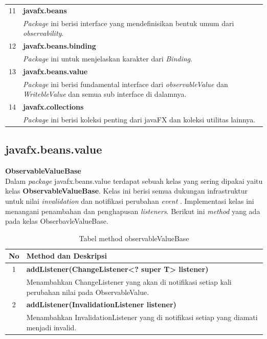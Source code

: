 \begin{table}[H]
\begin{tabular}{|c|p{12cm}|}
		11 & \textbf{javafx.beans}\\
			&	\textit{Package} ini berisi interface yang mendefinisikan bentuk umum dari \textit{observability}.\\ \hline
		12 & \textbf{javafx.beans.binding}\\
			&	\textit{Package} ini untuk menjelaskan karakter dari \textit{Binding}.\\ \hline	
		13 & \textbf{javafx.beans.value}\\
			&	\textit{Package} ini berisi fundamental interface dari \textit{observableValue} dan \textit{WritebleValue} dan semua sub interface di dalamnya.\\ \hline
		14 & \textbf{javafx.collections}\\
				&	\textit{Package} ini berisi koleksi penting dari javaFX dan koleksi utilitas lainnya.\\ \hline						
	\end{tabular}
\end{table}

\subsection{javafx.beans.value}
\textbf{ObservableValueBase}\\
Dalam \textit{package} javafx.beans.value terdapat sebuah kelas yang sering dipakai yaitu kelas \textbf{ObservableValueBase}. Kelas ini berisi semua dukungan infrastruktur untuk nilai \textit{invalidation} dan notifikasi perubahan \textit{event} . Implementasi kelas ini menangani penambahan dan penghapusan \textit{listeners}. Berikut ini \textit{method} yang ada pada kelas ObserbavleValueBase.
\begin{table}[H]
		\centering
		\caption{Tabel method observableValueBase}
		\label{tab:method_observableValueBase}
	\begin{tabular}{|c|p{12cm}|}
		\hline
		\textbf{No} & \textbf{Method dan Deskripsi} \\ \hline \hline
		1 & \textbf{addListener(ChangeListener<? super T> listener)}\\
			&	Menambahkan ChangeListener yang akan di notifikasi setiap kali perubahan nilai pada ObservableValue.\\ \hline
		2 & \textbf{	addListener(InvalidationListener listener)}\\
			&	Menambahkan InvalidationListener yang di notifikasi setiap yang diamati menjadi invalid.\\ \hline
	\end{tabular}
\end{table}



